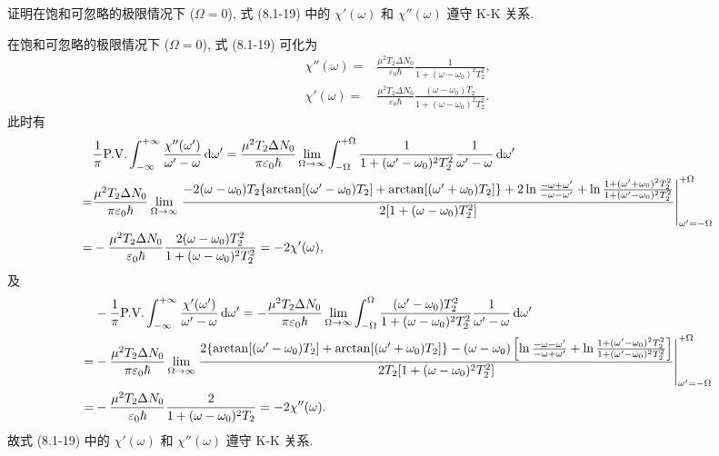 \documentclass{note}
\begin{document}
\begin{exe}
    证明在饱和可忽略的极限情况下 ($\Omega=0$), 式 (8.1-19) 中的 $\chi'(\omega)$ 和 $\chi''(\omega)$ 遵守 K-K 关系.
\end{exe}
\begin{pf}
    在饱和可忽略的极限情况下 ($\Omega=0$), 式 (8.1-19) 可化为
    \begin{align}
        \chi''(\omega)=&\frac{\mu^2T_2\Delta N_0}{\varepsilon_0\hbar}\frac{1}{1+(\omega-\omega_0)^2T_2^2},\\
        \chi'(\omega)=&\frac{\mu^2T_2\Delta N_0}{\varepsilon_0\hbar}\frac{(\omega-\omega_0)T_2}{1+(\omega-\omega_0)^2T_2^2}.
    \end{align}
    此时有
    \begin{align}
        \notag&\frac{1}{\pi}\text{P.V.}\int_{-\infty}^{+\infty}\frac{\chi''(\omega')}{\omega'-\omega}\,\mathrm{d}\omega'=\frac{\mu^2T_2\Delta N_0}{\pi\varepsilon_0\hbar}\lim_{\Omega\rightarrow\infty}\int_{-\Omega}^{+\Omega}\frac{1}{1+(\omega'-\omega_0)^2T_2^2}\frac{1}{\omega'-\omega}\,\mathrm{d}\omega'\\
        \notag=&\frac{\mu^2T_2\Delta N_0}{\pi\varepsilon_0\hbar}\lim_{\Omega\rightarrow\infty}\left.\frac{-2(\omega-\omega_0)T_2\{\arctan[(\omega'-\omega_0)T_2]+\arctan[(\omega'+\omega_0)T_2]\}+2\ln\frac{-\omega+\omega'}{-\omega-\omega'}+\ln\frac{1+(\omega'+\omega_0)^2T_2^2}{1+(\omega'-\omega_0)^2T_2^2}}{2[1+(\omega-\omega_0)T_2^2]}\right|_{\omega'=-\Omega}^{+\Omega}\\
        =&-\frac{\mu^2T_2\Delta N_0}{\varepsilon_0\hbar}\frac{2(\omega-\omega_0)T_2^2}{1+(\omega-\omega_0)^2T_2^2}=-2\chi'(\omega),
    \end{align}
    及
    \begin{align}
        \notag&-\frac{1}{\pi}\text{P.V.}\int_{-\infty}^{+\infty}\frac{\chi'(\omega')}{\omega'-\omega}\,\mathrm{d}\omega'=-\frac{\mu^2T_2\Delta N_0}{\pi\varepsilon_0\hbar}\lim_{\Omega\rightarrow\infty}\int_{-\Omega}^{\Omega}\frac{(\omega'-\omega_0)T_2^2}{1+(\omega-\omega_0)^2T_2^2}\frac{1}{\omega'-\omega}\,\mathrm{d}\omega'\\
        \notag=&-\frac{\mu^2T_2\Delta N_0}{\pi\varepsilon_0\hbar}\lim_{\Omega\rightarrow\infty}\left.\frac{2\{\arctan[(\omega'-\omega_0)T_2]+\arctan[(\omega'+\omega_0)T_2]\}-(\omega-\omega_0)\left[\ln\frac{-\omega-\omega'}{-\omega+\omega'}+\ln\frac{1+(\omega'-\omega_0)^2T_2^2}{1+(\omega'-\omega_0)^2T_2^2}\right]}{2T_2[1+(\omega-\omega_0)^2T_2^2]}\right|_{\omega'=-\Omega}^{+\Omega}\\
        =&-\frac{\mu^2T_2\Delta N_0}{\varepsilon_0\hbar}\frac{2}{1+(\omega-\omega_0)^2T_2}=-2\chi''(\omega).
    \end{align}
    故式 (8.1-19) 中的 $\chi'(\omega)$ 和 $\chi''(\omega)$ 遵守 K-K 关系.
\end{pf}
\ifx\allfiles\undefined
\end{document}
